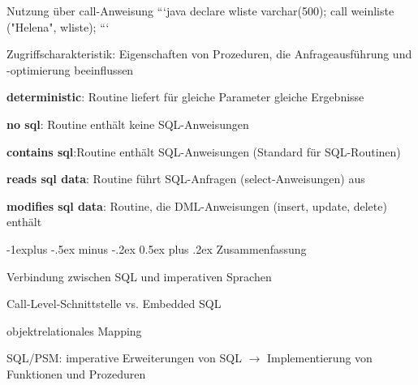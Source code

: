 \documentclass[a4paper]{article}
\makeatletter
\renewcommand{\subsection}{\@startsection{subsection}{2}{0mm}%
                                {-1explus -.5ex minus -.2ex}%
                                {0.5ex plus .2ex}%
                                {\normalfont\normalsize\bfseries}}
\makeatother
\begin{document}
\begin{multicols}{3}
    Nutzung über call-Anweisung
    ```java
    declare wliste varchar(500);
    call weinliste ("Helena", wliste);
    ```

    Zugriffscharakteristik:
    Eigenschaften von Prozeduren, die Anfrageausführung und -optimierung beeinflussen
    \begin{itemize*}
        \item \textbf{deterministic}: Routine liefert für gleiche Parameter gleiche Ergebnisse
        \item \textbf{no sql}: Routine enthält keine SQL-Anweisungen
        \item \textbf{contains sql}:Routine enthält SQL-Anweisungen (Standard für SQL-Routinen)
        \item \textbf{reads sql data}: Routine führt SQL-Anfragen (select-Anweisungen) aus
        \item \textbf{modifies sql data}: Routine, die DML-Anweisungen (insert, update, delete) enthält
    \end{itemize*}

    \subsection{Zusammenfassung}
    \begin{itemize*}
        \item Verbindung zwischen SQL und imperativen Sprachen
        \item Call-Level-Schnittstelle vs. Embedded SQL
        \item objektrelationales Mapping
        \item SQL/PSM: imperative Erweiterungen von SQL $\rightarrow$ Implementierung von Funktionen und Prozeduren
    \end{itemize*}


\end{multicols}
\end{document}
